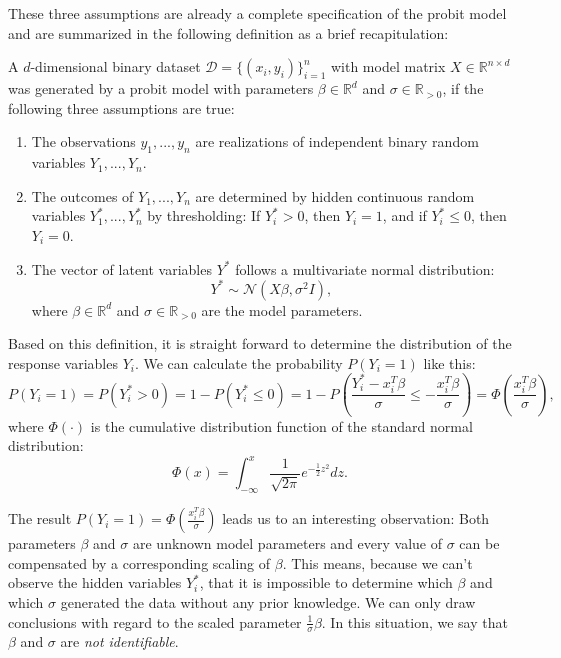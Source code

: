 These three assumptions are already a complete specification of the
probit model and are summarized in the following definition as a
brief recapitulation:

\begin{definition}
    A $d$-dimensional binary dataset $\mathcal{D} = \{(x_i, y_i)\}_{i=1}^n$
    with model matrix
    $X \in \mathbb{R}^{n \times d}$ was generated by a probit model with
    parameters $\beta \in \mathbb{R}^d$ and $\sigma \in \mathbb{R}_{>0}$, if
    the following three assumptions are true:
    \begin{enumerate}
        \item The observations $y_1, ..., y_n$ are realizations of independent
              binary random variables $Y_1, ..., Y_n$.
        \item The outcomes of $Y_1, ..., Y_n$ are determined by hidden
              continuous random variables $Y_1^\ast, ..., Y_n^\ast$ by
              thresholding: If $Y_i^\ast > 0$, then $Y_i = 1$, and if
              $Y_i^\ast \leq 0$, then $Y_i = 0$.
        \item The vector of latent variables $Y^\ast$ follows a multivariate
              normal distribution:
              \begin{equation*}
                  Y^\ast \sim \mathcal{N}(X \beta, \sigma^2 I),
              \end{equation*}
              where $\beta \in \mathbb{R}^d$ and $\sigma \in \mathbb{R}_{>0}$
              are the model parameters.
    \end{enumerate}
\end{definition}

\noindent Based on this definition, it is straight forward to determine the
distribution of the response variables $Y_i$.
We can calculate the probability $P(Y_i = 1)$ like this:
\begin{equation*}
    P(Y_i = 1) = P(Y_i^\ast > 0) = 1 - P(Y_i^\ast \leq 0)
    = 1 - P\left(\frac{Y_i^\ast - x_i^T \beta}{\sigma} \leq -\frac{x_i^T \beta}{\sigma} \right)
    = \Phi\left(\frac{x_i^T \beta}{\sigma} \right),
\end{equation*}
where $\Phi(\cdot)$ is the cumulative distribution function of the standard normal
distribution:
\begin{equation*}
    \Phi(x) = \int_{-\infty}^x \frac{1}{\sqrt{2 \pi}} e^{- \frac{1}{2} z^2} dz.
\end{equation*}

\noindent The result $P(Y_i = 1) = \Phi\left(\frac{x_i^T \beta}{\sigma} \right)$
leads us to an interesting observation:
Both parameters $\beta$ and $\sigma$ are unknown model parameters and
every value of $\sigma$ can be compensated by a corresponding scaling
of $\beta$. This means, because we can't observe the hidden variables $Y_i^\ast$,
that it is impossible to determine which $\beta$ and which $\sigma$
generated the data without any prior knowledge.
We can only draw conclusions with regard to the
scaled parameter $\frac{1}{\sigma}\beta$.
In this situation, we say that $\beta$ and $\sigma$ are
\textit{not identifiable}.

